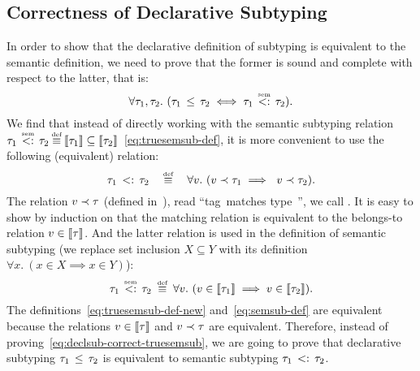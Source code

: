\subsection{Correctness of Declarative Subtyping}\label{sec:declsub-correct}

In order to show that the declarative definition of subtyping 
is equivalent to the semantic definition,
we need to prove that the former is sound and complete with respect
to the latter, that is:
\begin{equation}\label{eq:declsub-correct-truesemsub}
\forall \ty_1, \ty_2.\ (\bjsub{\ty_1}{\ty_2} \iff \bjtruesemsub{\ty_1}{\ty_2}).
\end{equation}
We find that instead of directly working 
with the semantic subtyping relation $\bjtruesemsub{\ty_1}{\ty_2} \defsign
\interpty{\ty_1} \subseteq \interpty{\ty_2}$~\eqref{eq:truesemsub-def},
it is more convenient to use the following (equivalent) relation:
\begin{equation}\label{eq:semsub-def}
\bjsemsub{\ty_1}{\ty_2} \quad \defsign \quad
\forall \vty.\ (\bjmtch{\vty}{\ty_1} \implies\ \bjmtch{\vty}{\ty_2}).
\end{equation}
The relation $v \prec \tau$ (defined in~), 
read ``tag~\vty matches type~\ty'', 
we call .
It is easy to show by induction on \ty that the matching relation
is equivalent to the belongs-to relation $v \in \llbracket \tau \rrbracket$.
And the latter relation is used in the definition of semantic subtyping
(we replace set inclusion $X \subseteq Y$ with its definition 
$\forall x.\ (x \in X \implies x \in Y)$):
\begin{equation}\label{eq:truesemsub-def-new}
\bjtruesemsub{\ty_1}{\ty_2} \;\defsign \;
\forall \vty.\ (\vty \in \interpty{\ty_1} \implies \vty \in \interpty{\ty_2}).
\end{equation}
The definitions~\eqref{eq:truesemsub-def-new} and~\eqref{eq:semsub-def}
are equivalent because the relations 
$v \in \llbracket \tau \rrbracket$ and $v \prec \tau$ are equivalent.
Therefore, instead of proving~\eqref{eq:declsub-correct-truesemsub},
we are going to prove that declarative subtyping $\tau_1 \, \leq \, \tau_2$
is equivalent to semantic subtyping $\tau_1 \, <: \, \tau_2$.

